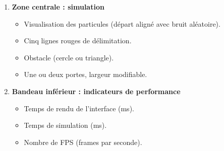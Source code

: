 \documentclass[a4paper,12pt]{article}
\begin{document}
\begin{enumerate}
  \item \textbf{Zone centrale : simulation}
  \begin{itemize}
    \item Visualisation des particules (départ aligné avec bruit aléatoire).
    \item Cinq lignes rouges de délimitation.
    \item Obstacle (cercle ou triangle).
    \item Une ou deux portes, largeur modifiable.
  \end{itemize}

  \item \textbf{Bandeau inférieur : indicateurs de performance}
  \begin{itemize}
    \item Temps de rendu de l'interface (ms).
    \item Temps de simulation (ms).
    \item Nombre de FPS (frames par seconde).
  \end{itemize}
\end{enumerate}
\end{document}
